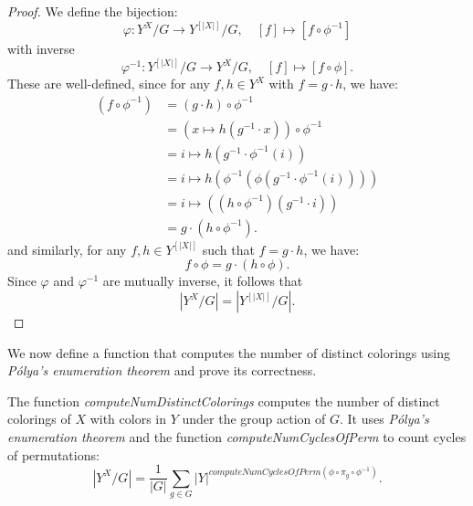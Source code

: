 \begin{proof}
  \leanok
  We define the bijection:
  \begin{equation*}
    \varphi : Y^X/G \to Y^{[|X|]}/G, \quad [f] \mapsto [f \circ \phi^{-1}]
  \end{equation*}
  with inverse
  \begin{equation*}
    \varphi^{-1} : Y^{[|X|]}/G \to Y^X/G, \quad [f] \mapsto [f \circ \phi].
  \end{equation*}
  These are well-defined, since for any $f, h \in Y^X$ with $f = g \cdot h$, we have:
  \begin{align*}
    (f \circ \phi^{-1}) &= (g \cdot h) \circ \phi^{-1} \\
    &= (x \mapsto h(g^{-1} \cdot x)) \circ \phi^{-1} \\
    &= i \mapsto h(g^{-1} \cdot \phi^{-1}(i)) \\
    &= i \mapsto h(\phi^{-1}(\phi(g^{-1} \cdot \phi^{-1}(i)))) \\
    &= i \mapsto ((h \circ \phi^{-1})(g^{-1} \cdot i)) \\
    &= g \cdot (h \circ \phi^{-1}).
  \end{align*}
  and similarly, for any $f, h \in Y^{[|X|]}$ such that $f = g \cdot h$, we have:
  \begin{equation*}
    f \circ \phi = g \cdot (h \circ \phi).
  \end{equation*}
  Since $\varphi$ and $\varphi^{-1}$ are mutually inverse, it follows that
  \begin{equation*}
    |Y^X/G| = |Y^{[|X|]}/G|.
  \end{equation*}
\end{proof}

We now define a function that computes the number of distinct colorings using \emph{Pólya's enumeration theorem} and prove its correctness.

\begin{proposition}
  \label{prop:computeNumDistinctColorings}
  \leanok
  The function \emph{computeNumDistinctColorings} computes the number of distinct colorings of $X$ with colors in $Y$ under the group action of $G$. It uses \emph{Pólya's enumeration theorem} and the function \emph{computeNumCyclesOfPerm} to count cycles of permutations:
  \begin{equation*}
    |Y^X/G| = \frac{1}{|G|} \sum_{g \in G} |Y|^{\textit{computeNumCyclesOfPerm} (\phi \circ \pi_g \circ \phi^{-1})}.
  \end{equation*}
\end{proposition}

